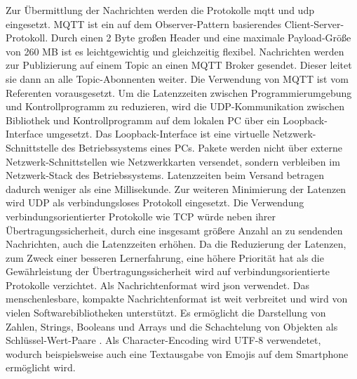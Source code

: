 \documentclass[11pt,a4paper]{report}
\begin{document}
Zur Übermittlung der Nachrichten werden die Protokolle \acrfull{mqtt} und \acrfull{udp} eingesetzt.
MQTT ist ein auf dem Observer-Pattern basierendes Client-Server-Protokoll.
Durch einen 2 Byte großen Header und eine maximale Payload-Größe von 260 MB \cite{mqtt-size} ist es leichtgewichtig und gleichzeitig flexibel.
Nachrichten werden zur Publizierung auf einem Topic an einen MQTT Broker gesendet.
Dieser leitet sie dann an alle Topic-Abonnenten weiter.
Die Verwendung von MQTT ist vom Referenten vorausgesetzt.
Um die Latenzzeiten zwischen Programmierumgebung und Kontrollprogramm zu reduzieren, wird die UDP-Kommunikation zwischen Bibliothek und Kontrollprogramm auf dem lokalen PC über ein Loopback-Interface umgesetzt.
Das Loopback-Interface ist eine virtuelle Netzwerk-Schnittstelle des Betriebssystems eines PCs.
Pakete werden nicht über externe Netzwerk-Schnittstellen wie Netzwerkkarten versendet, sondern verbleiben im Netzwerk-Stack des Betriebssystems.
Latenzzeiten beim Versand betragen dadurch weniger als eine Millisekunde.
Zur weiteren Minimierung der Latenzen wird UDP als verbindungsloses Protokoll eingesetzt.
Die Verwendung verbindungsorientierter Protokolle wie TCP würde neben ihrer Übertragungssicherheit, durch eine insgesamt größere Anzahl an zu sendenden Nachrichten, auch die Latenzzeiten erhöhen.
Da die Reduzierung der Latenzen, zum Zweck einer besseren Lernerfahrung, eine höhere Priorität hat als die Gewährleistung der Übertragungssicherheit wird auf verbindungsorientierte Protokolle verzichtet.
Als Nachrichtenformat wird \acrfull{json} verwendet.
Das menschenlesbare, kompakte Nachrichtenformat ist weit verbreitet und wird von vielen Softwarebibliotheken unterstützt.
Es ermöglicht die Darstellung von Zahlen, Strings, Booleans und Arrays und die Schachtelung von Objekten als Schlüssel-Wert-Paare \cite{json-rfc}.
Als Character-Encoding wird UTF-8 verwendetet, wodurch beispielsweise auch eine Textausgabe von Emojis auf dem Smartphone ermöglicht wird.
\end{document}
